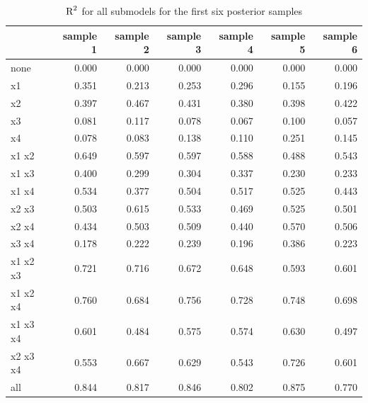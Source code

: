 \documentclass[11pt,a4paper,twoside]{book}
\newenvironment{knitrout}{}{} %
\begin{document}
\begin{knitrout}
\color{fgcolor}\begin{table}

\caption{\label{tab:simdata.postsample3}$ \text{R}^2$ for all submodels for the first six posterior samples}
\centering
\begin{tabular}[t]{lrrrrrr}
\toprule
  & sample 1 & sample 2 & sample 3 & sample 4 & sample 5 & sample 6\\
\midrule
none & 0.000 & 0.000 & 0.000 & 0.000 & 0.000 & 0.000\\
x1 & 0.351 & 0.213 & 0.253 & 0.296 & 0.155 & 0.196\\
x2 & 0.397 & 0.467 & 0.431 & 0.380 & 0.398 & 0.422\\
x3 & 0.081 & 0.117 & 0.078 & 0.067 & 0.100 & 0.057\\
x4 & 0.078 & 0.083 & 0.138 & 0.110 & 0.251 & 0.145\\
x1 x2 & 0.649 & 0.597 & 0.597 & 0.588 & 0.488 & 0.543\\
x1 x3 & 0.400 & 0.299 & 0.304 & 0.337 & 0.230 & 0.233\\
x1 x4 & 0.534 & 0.377 & 0.504 & 0.517 & 0.525 & 0.443\\
x2 x3 & 0.503 & 0.615 & 0.533 & 0.469 & 0.525 & 0.501\\
x2 x4 & 0.434 & 0.503 & 0.509 & 0.440 & 0.570 & 0.506\\
x3 x4 & 0.178 & 0.222 & 0.239 & 0.196 & 0.386 & 0.223\\
x1 x2 x3 & 0.721 & 0.716 & 0.672 & 0.648 & 0.593 & 0.601\\
x1 x2 x4 & 0.760 & 0.684 & 0.756 & 0.728 & 0.748 & 0.698\\
x1 x3 x4 & 0.601 & 0.484 & 0.575 & 0.574 & 0.630 & 0.497\\
x2 x3 x4 & 0.553 & 0.667 & 0.629 & 0.543 & 0.726 & 0.601\\
all & 0.844 & 0.817 & 0.846 & 0.802 & 0.875 & 0.770\\
\bottomrule
\end{tabular}
\end{table}


\end{knitrout}
\end{document}
